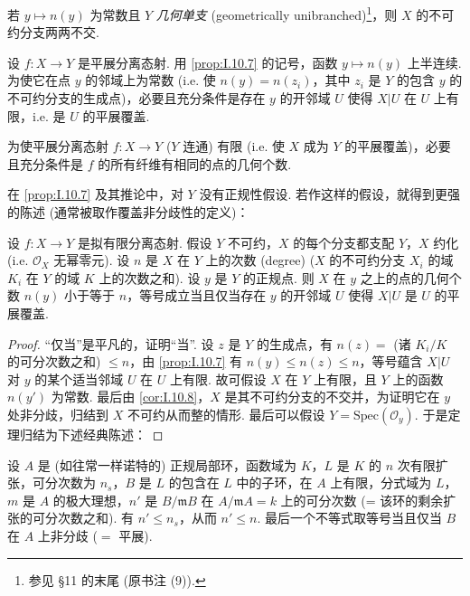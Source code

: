 \begin{corollary}\label{cor:I.10.8}
若 $y \mapsto n(y)$ 为常数且 $Y$ \emph{几何单支} (geometrically unibranched)\footnote{参见 §11 的末尾 (原书注 (9)).}，则 $X$ 的不可约分支两两不交.
\end{corollary}

\begin{proposition}\label{prop:I.10.9}
设 $f \colon X \to Y$ 是平展分离态射. 用 \ref{prop:I.10.7} 的记号，函数 $y \mapsto n(y)$ 上半连续. 为使它在点 $y$ 的邻域上为常数 (i.e. 使 $n(y) = n(z_i)$，其中 $z_i$ 是 $Y$ 的包含 $y$ 的不可约分支的生成点)，必要且充分条件是存在 $y$ 的开邻域 $U$ 使得 $X|U$ 在 $U$ 上有限，i.e. 是 $U$ 的平展覆盖.
\end{proposition}

\begin{corollary}\label{cor:I.10.10}
为使平展分离态射 $f \colon X \to Y$ ($Y$ 连通) 有限 (i.e. 使 $X$ 成为 $Y$ 的平展覆盖)，必要且充分条件是 $f$ 的所有纤维有相同的点的几何个数.
\end{corollary}

在 \ref{prop:I.10.7} 及其推论中，对 $Y$ 没有正规性假设. 若作这样的假设，就得到更强的陈述 (通常被取作覆盖非分歧性的定义)：

\begin{theorem}\label{thm:I.10.11}
设 $f \colon X \to Y$ 是拟有限分离态射. 假设 $Y$ 不可约，$X$ 的每个分支都支配 $Y$，$X$ 约化 (i.e. $\mathcal{O}_X$ 无幂零元). 设 $n$ 是 $X$ 在 $Y$ 上的次数 (degree) ($X$ 的不可约分支 $X_i$ 的域 $K_i$ 在 $Y$ 的域 $K$ 上的次数之和). 设 $y$ 是 $Y$ 的正规点. 则 $X$ 在 $y$ 之上的点的几何个数 $n(y)$ 小于等于 $n$，等号成立当且仅当存在 $y$ 的开邻域 $U$ 使得 $X|U$ 是 $U$ 的平展覆盖.
\end{theorem}

\begin{proof}
``仅当''是平凡的，证明``当''. 设 $z$ 是 $Y$ 的生成点，有 $n(z) =$ (诸 $K_i/K$ 的可分次数之和) $\leqslant n$，由 \ref{prop:I.10.7} 有 $n(y) \leqslant n(z) \leqslant n$，等号蕴含 $X|U$ 对 $y$ 的某个适当邻域 $U$ 在 $U$ 上有限. 故可假设 $X$ 在 $Y$ 上有限，且 $Y$ 上的函数 $n(y')$ 为常数. 最后由 \ref{cor:I.10.8}，$X$ 是其不可约分支的不交并，为证明它在 $y$ 处非分歧，归结到 $X$ 不可约从而整的情形. 最后可以假设 $Y = \mathrm{Spec}(\mathcal{O}_y)$. 于是定理归结为下述经典陈述：
\end{proof}

\begin{corollary}\label{cor:I.10.12}
设 $A$ 是 (如往常一样诺特的) 正规局部环，函数域为 $K$，$L$ 是 $K$ 的 $n$ 次有限扩张，可分次数为 $n_s$，$B$ 是 $L$ 的包含在 $L$ 中的子环，在 $A$ 上有限，分式域为 $L$，$m$ 是 $A$ 的极大理想，$n'$ 是 $B/\mathfrak{m}B$ 在 $A/\mathfrak{m}A = k$ 上的可分次数 (= 该环的剩余扩张的可分次数之和). 有 $n' \leqslant n_s$，从而 $n' \leqslant n$. 最后一个不等式取等号当且仅当 $B$ 在 $A$ 上非分歧 ($=$ 平展).
\end{corollary}

